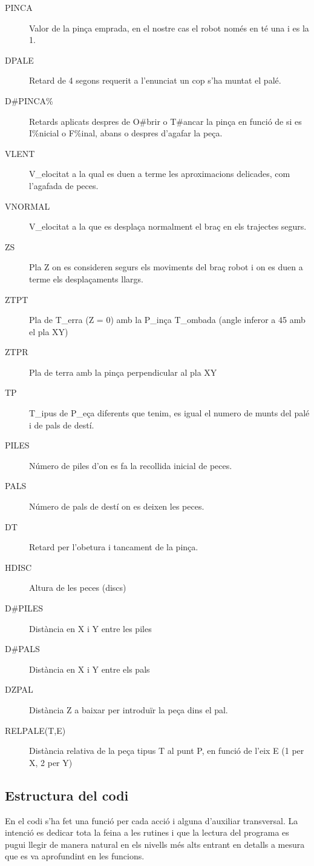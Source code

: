 \begin{description}
\item [PINCA] Valor de la pinça emprada, en el nostre cas el robot només en té una i es la 1.
\item [DPALE] Retard de 4 segons requerit a l'enunciat un cop s'ha muntat el palé.
\item [D\#PINCA\%] Retards aplicats despres de O\#brir o T\#ancar la pinça en funció de si es I\%nicial o F\%inal,
abans o despres d'agafar la peça.
\item [VLENT] V\_elocitat a la qual es duen a terme les aproximacions delicades, com l'agafada de peces.
\item [VNORMAL] V\_elocitat a la que es desplaça normalment el braç en els trajectes segurs.
\item [ZS] Pla Z on es consideren segurs els moviments del braç robot i on es duen a terme els
desplaçaments llargs.
\item [ZTPT] Pla de T\_erra (Z = 0) amb la P\_inça T\_ombada (angle inferor a 45 amb el pla XY)
\item [ZTPR] Pla de terra amb la pinça perpendicular al pla XY                                                                                                           
\item [TP] T\_ipus de P\_eça diferents que tenim, es igual el numero de munts del palé i de pals
de destí.
\item [PILES] Número de piles d'on es fa la recollida inicial de peces.
\item [PALS] Número de pals de destí on es deixen les peces.
\item [DT] Retard per l'obetura i tancament de la pinça.
\item [HDISC] Altura de les peces (discs)
\item [D\#PILES] Distància en X i Y entre les piles
\item [D\#PALS] Distància en X i Y entre els pals
\item [DZPAL] Distància Z a baixar per introduïr la peça dins el pal.
\item [RELPALE(T,E)] Distància relativa de la peça tipus T al punt P, en funció de l'eix E (1 per X, 2 per Y)
\end{description}

\subsection{Estructura del codi}
En el codi s'ha fet una funció per cada acció i alguna d'auxiliar transversal.
La intenció es dedicar tota la feina a les rutines i que la lectura del programa
es pugui llegir de manera natural en els nivells més alts entrant en detalls
a mesura que es va aprofundint en les funcions.

